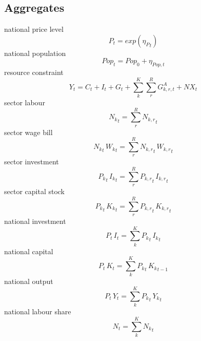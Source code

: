 \subsection{Aggregates}
national price level
\begin{dmath}
{P_{t}}=exp\left({{\eta_{P}}_{t}}\right)
\end{dmath}
national population
\begin{dmath}
Pop_{t}=Pop_0 + \eta_{Pop,t}
\end{dmath}
resource constraint
\begin{dmath}
{Y_{t}}={C_{t}}+{I_{t}}+{G_{t}}+\sum_{k}^{K} \sum_{r}^{R} {G^{A}_{k,r,t}} + {NX_{t}}
\end{dmath}
sector labour
\begin{dmath}
{{N_k}_{t}}={\sum_{r}^{R} {N_{k,r}}_{t}}
\end{dmath}
sector wage bill
\begin{dmath}
{{N_k}_{t}}\, {{W_k}_{t}}={\sum_{r}^{R} {N_{k,r}}_{t}}\, {{W_{k,r}}_{t}}
\end{dmath}
sector investment
\begin{dmath}
{{P_k}_{t}}\, {{I_k}_{t}}={\sum_{r}^{R} {P_{k,r}}_{t}}\, {{I_{k,r}}_{t}}
\end{dmath}
sector capital stock
\begin{dmath}
{{P_k}_{t}}\, {{K_k}_{t}}={\sum_{r}^{R} {P_{k,r}}_{t}}\, {{K_{k,r}}_{t}}
\end{dmath}
national investment
\begin{dmath}
{P_{t}}\, {I_{t}}={\sum_{k}^{K} {P_k}_{t}}\, {{I_k}_{t}}
\end{dmath}
national capital
\begin{dmath}
{P_{t}}\, {K_{t}}={\sum_{k}^{K} {P_k}_{t}}\, {{K_k}_{t-1}}
\end{dmath}
national output
\begin{dmath}
{P_{t}}\, {Y_{t}}={\sum_{k}^{K} {P_k}_{t}}\, {{Y_k}_{t}}
\end{dmath}
national labour share
\begin{dmath}
{N_{t}}={\sum_{k}^{K} {N_k}_{t}}
\end{dmath}
